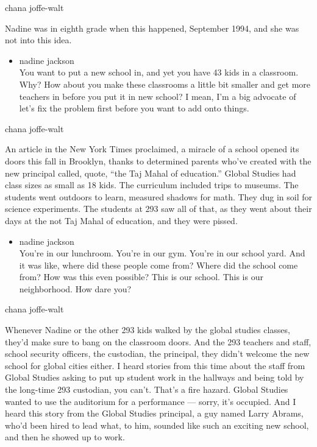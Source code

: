 chana joffe-walt

Nadine was in eighth grade when this happened, September 1994, and she
was not into this idea.

\begin{itemize}
\tightlist
\item
  nadine jackson\\
  You want to put a new school in, and yet you have 43 kids in a
  classroom. Why? How about you make these classrooms a little bit
  smaller and get more teachers in before you put it in new school? I
  mean, I'm a big advocate of let's fix the problem first before you
  want to add onto things.
\end{itemize}

chana joffe-walt

An article in the New York Times proclaimed, a miracle of a school
opened its doors this fall in Brooklyn, thanks to determined parents
who've created with the new principal called, quote, ``the Taj Mahal of
education.'' Global Studies had class sizes as small as 18 kids. The
curriculum included trips to museums. The students went outdoors to
learn, measured shadows for math. They dug in soil for science
experiments. The students at 293 saw all of that, as they went about
their days at the not Taj Mahal of education, and they were pissed.

\begin{itemize}
\tightlist
\item
  nadine jackson\\
  You're in our lunchroom. You're in our gym. You're in our school yard.
  And it was like, where did these people come from? Where did the
  school come from? How was this even possible? This is our school. This
  is our neighborhood. How dare you?
\end{itemize}

chana joffe-walt

Whenever Nadine or the other 293 kids walked by the global studies
classes, they'd make sure to bang on the classroom doors. And the 293
teachers and staff, school security officers, the custodian, the
principal, they didn't welcome the new school for global cities either.
I heard stories from this time about the staff from Global Studies
asking to put up student work in the hallways and being told by the
long-time 293 custodian, you can't. That's a fire hazard. Global Studies
wanted to use the auditorium for a performance --- sorry, it's occupied.
And I heard this story from the Global Studies principal, a guy named
Larry Abrams, who'd been hired to lead what, to him, sounded like such
an exciting new school, and then he showed up to work.

